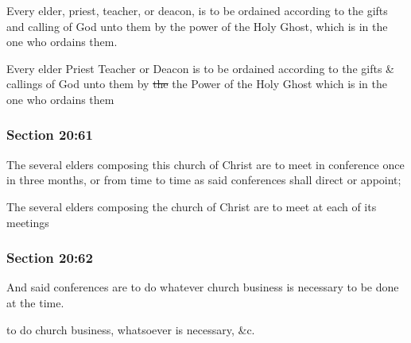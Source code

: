 		\begin{framed}
		\scriptsize
			\begin{compactdesc}
				\item[JSP] Every elder, priest, teacher, or deacon, is to be ordained according to the gifts and calling of God unto them by the power of the Holy Ghost, which is in the one who ordains them. 
				\item[RB1] Every elder Priest Teacher or Deacon is to be ordained according to the gifts \& callings of God unto them by \sout{the} the Power of the Holy Ghost which is in the one who ordains them
			\end{compactdesc}
		\end{framed}

	\subsubsection{Section 20:61} %
		\label{DC20-61}

		The several elders composing this church of Christ are to meet in conference once in three months, or from time to time as said conferences shall direct or appoint;

		\begin{framed}
		\scriptsize
			\begin{compactdesc}
				\item[JSP] The several elders composing the church of Christ are to meet at each of its meetings 
				\item[RB1] 
				\item[BC] 
			\end{compactdesc}
		\end{framed}

	\subsubsection{Section 20:62} %
		\label{DC20-62}

		And said conferences are to do whatever church business is necessary to be done at the time.

		\begin{framed}
		\scriptsize
			\begin{compactdesc}
				\item[JSP] to do church business, whatsoever is necessary, \&c. 
				\item[RB1] 
				\item[BC] 
			\end{compactdesc}
		\end{framed}

